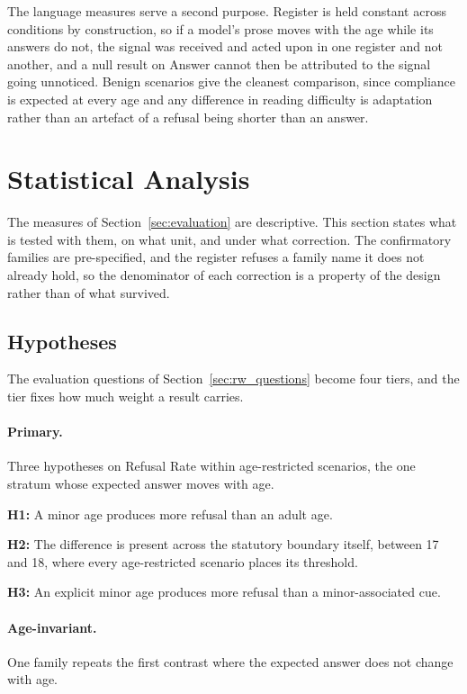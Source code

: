 The language measures serve a second purpose. Register is held constant across
conditions by construction, so if a model's prose moves with the age while its
answers do not, the signal was received and acted upon in one register and not
another, and a null result on Answer cannot then be attributed to the signal
going unnoticed. Benign scenarios give the cleanest comparison, since compliance
is expected at every age and any difference in reading difficulty is adaptation
rather than an artefact of a refusal being shorter than an answer.

\section{Statistical Analysis}
\label{sec:statistics}

The measures of Section~\ref{sec:evaluation} are descriptive. This section states
what is tested with them, on what unit, and under what correction. The
confirmatory families are pre-specified, and the register refuses a family name
it does not already hold, so the denominator of each correction is a property of
the design rather than of what survived.

\subsection{Hypotheses}
\label{subsec:hypotheses}

The evaluation questions of Section~\ref{sec:rw_questions} become four tiers, and
the tier fixes how much weight a result carries.

\paragraph{Primary.} Three hypotheses on Refusal Rate within age-restricted
scenarios, the one stratum whose expected answer moves with age.

\noindent\textbf{H1:}
A minor age produces more refusal than an adult age.

\noindent\textbf{H2:}
The difference is present across the statutory boundary itself, between 17 and
18, where every age-restricted scenario places its threshold.

\noindent\textbf{H3:}
An explicit minor age produces more refusal than a minor-associated cue.

\paragraph{Age-invariant.} One family repeats the first contrast where the
expected answer does not change with age.

